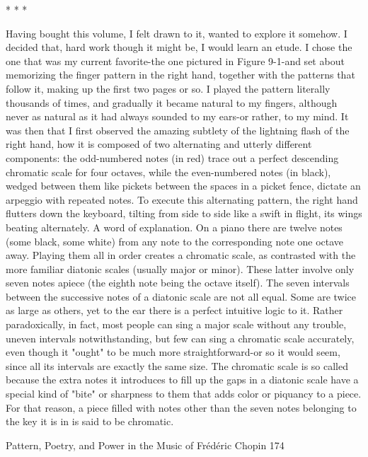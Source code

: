                                          *    *    *

         Having bought this volume, I felt drawn to it, wanted to explore it somehow. I
decided that, hard work though it might be, I would learn an etude. I chose the one that
was my current favorite-the one pictured in Figure 9-1-and set about memorizing the
finger pattern in the right hand, together with the patterns that follow it, making up the
first two pages or so. I played the pattern literally thousands of times, and gradually it
became natural to my fingers, although never as natural as it had always sounded to my
ears-or rather, to my mind.
         It was then that I first observed the amazing subtlety of the lightning flash of the
right hand, how it is composed of two alternating and utterly different components: the
odd-numbered notes (in red) trace out a perfect descending chromatic scale for four
octaves, while the even-numbered notes (in black), wedged between them like pickets
between the spaces in a picket fence, dictate an arpeggio with repeated notes. To execute
this alternating pattern, the right hand flutters down the keyboard, tilting from side to side
like a swift in flight, its wings beating alternately.
         A word of explanation. On a piano there are twelve notes (some black, some
white) from any note to the corresponding note one octave away. Playing them all in
order creates a chromatic scale, as contrasted with the more familiar diatonic scales
(usually major or minor). These latter involve only seven notes apiece (the eighth note
being the octave itself). The seven intervals between the successive notes of a diatonic
scale are not all equal. Some are twice as large as others, yet to the ear there is a perfect
intuitive logic to it. Rather paradoxically, in fact, most people can sing a major scale
without any trouble, uneven intervals notwithstanding, but few can sing a chromatic scale
accurately, even though it "ought" to be much more straightforward-or so it would seem,
since all its intervals are exactly the same size. The chromatic scale is so called because
the extra notes it introduces to fill up the gaps in a diatonic scale have a special kind of
"bite" or sharpness to them that adds color or piquancy to a piece. For that reason, a piece
filled with notes other than the seven notes belonging to the key it is in is said to be
chromatic.




Pattern, Poetry, and Power in the Music of Frédéric Chopin                                174

